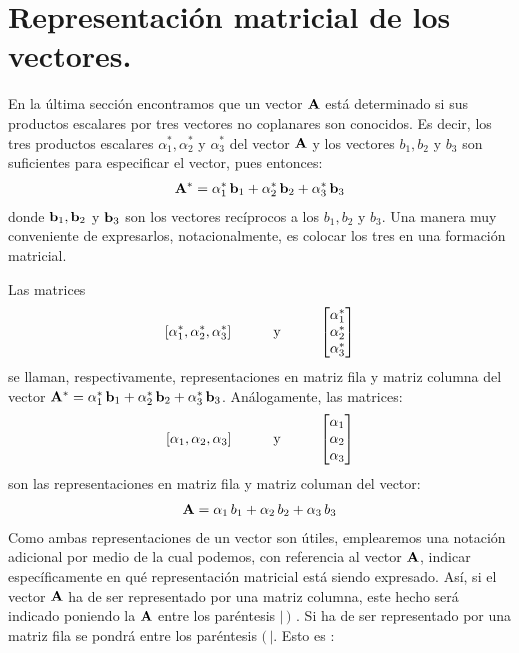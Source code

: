 \section{Representación matricial de los vectores.}

En la última sección encontramos que un vector $\vb{A}$ está determinado si sus productos escalares por tres vectores no coplanares son conocidos. Es decir, los tres productos escalares $\alpha_{1}^{*}, \alpha_{2}^{*}$ y $\alpha_{3}^{*}$ del vector $\vb{A}$ y los vectores 
$b_{1}, b_{2}$ y $b_{3}$ son suficientes para especificar el vector, pues entonces:
\begin{align*}
\vb{A}^{*} = \alpha_{1}^{*} \, \vb{b}_{1} + \alpha_{2}^{*} \, \vb{b}_{2} + \alpha_{3}^{*} \, \vb{b}_{3}    
\end{align*}
donde $\vb{b}_{1}, \vb{b}_{2}$ y $\vb{b}_{3}$ son los vectores recíprocos a los $b_{1}, b_{2}$ y $b_{3}$. Una manera muy conveniente de expresarlos, notacionalmente, es colocar los tres en una formación matricial. 
\par
Las matrices 
\begin{align*}
\left[ \alpha_{1}^{*}, \alpha_{2}^{*}, \alpha_{3}^{*} \right] \hspace{1cm} \text{y} \hspace{1cm} \mqty[ \alpha_{1}^{*} \\ \alpha_{2}^{*} \\ \alpha_{3}^{*} ]
\end{align*}
se llaman, respectivamente, representaciones en matriz fila y matriz columna del vector $\vb{A}^{*} = \alpha_{1}^{*} \, \vb{b}_{1} + \alpha_{2}^{*} \, \vb{b}_{2} + \alpha_{3}^{*} \, \vb{b}_{3}$. Análogamente, las matrices:
\begin{align*}
\left[ \alpha_{1}, \alpha_{2}, \alpha_{3} \right] \hspace{1cm} \text{y} \hspace{1cm} \mqty[ \alpha_{1} \\ \alpha_{2} \\ \alpha_{3} ]
\end{align*}
son las representaciones en matriz fila y matriz columan del vector:
\begin{align*}
\vb{A} = \alpha_{1} \, b_{1} + \alpha_{2} \, b_{2} + \alpha_{3} \, b_{3}
\end{align*}
Como ambas representaciones de un vector son útiles, emplearemos una notación adicional por medio de la cual podemos, con referencia al vector $\vb{A}$, indicar específicamente en qué representación matricial está siendo expresado. Así, si el vector $\vb{A}$ ha de ser representado por una matriz columna, este hecho será indicado poniendo la $\vb{A}$ entre los paréntesis $|\, )$ . Si ha de ser  representado por una matriz fila se pondrá entre los paréntesis $( \, |$. Esto es :
